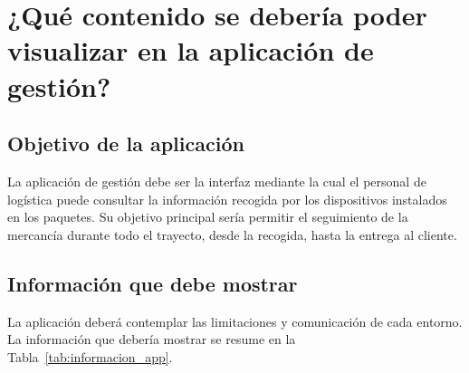 \documentclass[11pt,a4paper]{article}
\begin{document}
\clearpage
\section{¿Qué contenido se debería poder visualizar en la aplicación de gestión?}
\label{sec:apartado8}

\subsection{Objetivo de la aplicación}
\label{sec:apartado8_1}

La aplicación de gestión debe ser la interfaz mediante la cual el personal de logística puede consultar la información recogida por los dispositivos instalados en los paquetes. Su objetivo principal sería permitir el seguimiento de la mercancía durante todo el trayecto, desde la recogida, hasta la entrega al cliente.

\subsection{Información que debe mostrar}
\label{sec:apartado8_2}

La aplicación deberá contemplar las limitaciones y comunicación de cada entorno. La información que debería mostrar se resume en la Tabla~\ref{tab:informacion_app}.
\end{document}
